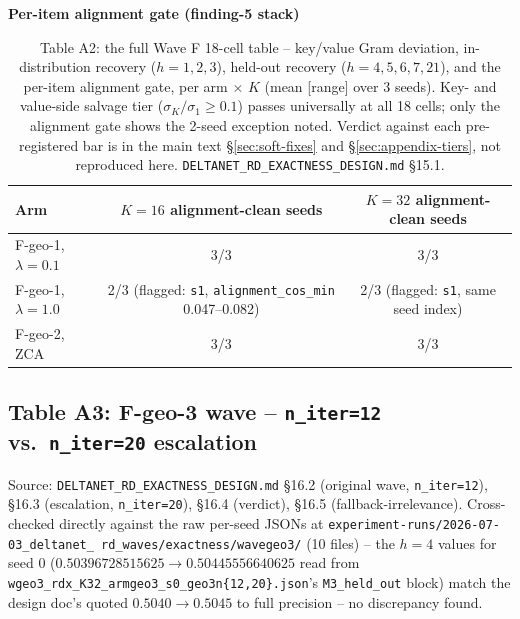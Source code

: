 \begin{table}[htbp]
\vspace{10pt}
\textbf{Per-item alignment gate (finding-5 stack)}\\[2pt]
\begin{tabular}{lcc}
\toprule
Arm & $K{=}16$ alignment-clean seeds & $K{=}32$ alignment-clean seeds \\
\midrule
F-geo-1, $\lambda{=}0.1$ & 3/3 & 3/3 \\
F-geo-1, $\lambda{=}1.0$ & 2/3 (flagged: \texttt{s1}, \texttt{alignment\_cos\_min} 0.047--0.082) & 2/3 (flagged: \texttt{s1}, same seed index) \\
F-geo-2, ZCA & 3/3 & 3/3 \\
\bottomrule
\end{tabular}
\caption{Table A2: the full Wave F 18-cell table -- key/value Gram
deviation, in-distribution recovery ($h{=}1,2,3$), held-out recovery
($h{=}4,5,6,7,21$), and the per-item alignment gate, per arm $\times$ $K$
(mean [range] over 3 seeds). Key- and value-side salvage tier
($\sigma_K/\sigma_1 \geq 0.1$) passes universally at all 18 cells; only
the alignment gate shows the 2-seed exception noted. Verdict against each
pre-registered bar is in the main text \S\ref{sec:soft-fixes} and
\S\ref{sec:appendix-tiers}, not reproduced here.
\texttt{DELTANET\_RD\_EXACTNESS\_DESIGN.md} \S15.1.}
\end{table}

\clearpage
\subsection{Table A3: F-geo-3 wave -- \texttt{n\_iter=12} vs.\ \texttt{n\_iter=20} escalation}
\label{tab:a3-fgeo3}

Source: \texttt{DELTANET\_RD\_EXACTNESS\_DESIGN.md} \S16.2 (original wave,
\texttt{n\_iter=12}), \S16.3 (escalation, \texttt{n\_iter=20}), \S16.4
(verdict), \S16.5 (fallback-irrelevance). Cross-checked directly against
the raw per-seed JSONs at \texttt{experiment-runs/2026-07-03\_deltanet\_
rd\_waves/exactness/wavegeo3/} (10 files) -- the $h{=}4$ values for seed 0
($0.50396728515625 \to 0.50445556640625$ read from
\texttt{wgeo3\_rdx\_K32\_armgeo3\_s0\_geo3n\{12,20\}.json}'s
\texttt{M3\_held\_out} block) match the design doc's quoted
$0.5040\to0.5045$ to full precision -- no discrepancy found.

